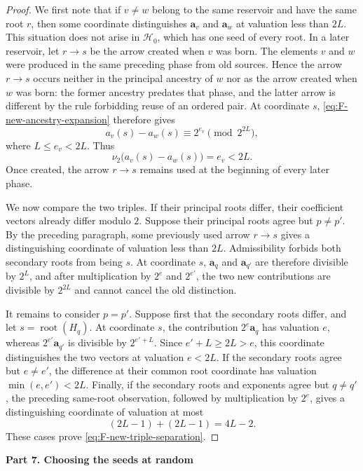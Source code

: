 \documentclass{article}
\theoremstyle{definition}
\begin{document}
\begin{proof}
We first note that if $v\neq w$ belong to the same reservoir and have the same
root $r$, then some coordinate distinguishes $\mathbf a_v$ and $\mathbf a_w$
at valuation less than $2L$.  This situation does not arise in
$\mathcal H_0$, which has one seed of every root.  In a later reservoir, let
$r\to s$ be the arrow created when $v$ was born.  The elements $v$ and $w$
were produced in the same preceding phase from old sources.  Hence the arrow
$r\to s$ occurs neither in the principal ancestry of $w$ nor as the arrow
created when $w$ was born: the former ancestry predates that phase, and the
latter arrow is different by the rule forbidding reuse of an ordered pair.
At coordinate $s$,
\eqref{eq:F-new-ancestry-expansion} therefore gives
$$
 a_v(s)-a_w(s)\equiv2^{e_v}\pmod {2^{2L}},
$$
where $L\leq e_v<2L$.  Thus
$$
 \nu_2\bigl(a_v(s)-a_w(s)\bigr)=e_v<2L.
$$
Once created, the arrow $r\to s$ remains used at the beginning of every later
phase.

We now compare the two triples.  If their principal roots differ, their
coefficient vectors already differ modulo $2$.  Suppose their principal roots
agree but $p\neq p'$.  By the preceding paragraph, some previously used arrow
$r\to s$ gives a distinguishing coordinate of valuation less than $2L$.
Admissibility forbids both secondary roots from being $s$.  At coordinate $s$,
$\mathbf a_q$ and $\mathbf a_{q'}$ are therefore divisible by $2^L$, and after
multiplication by $2^e$ and $2^{e'}$, the two new contributions are divisible
by $2^{2L}$ and cannot cancel the old distinction.

It remains to consider $p=p'$.  Suppose first that the secondary roots differ,
and let $s=\operatorname{root}(H_q)$.  At coordinate $s$, the contribution
$2^e\mathbf a_q$ has valuation $e$, whereas
$2^{e'}\mathbf a_{q'}$ is divisible by $2^{e'+L}$.  Since
$e'+L\geq2L>e$, this coordinate distinguishes the two vectors at valuation
$e<2L$.  If the secondary roots agree but $e\neq e'$, the difference at their common root coordinate has valuation $\min(e,e')<2L$.  Finally, if the secondary roots and exponents agree
but $q\neq q'$, the preceding same-root observation, followed by multiplication
by $2^e$, gives a distinguishing coordinate of valuation at most
$$
 (2L-1)+(2L-1)=4L-2.
$$
These cases prove \eqref{eq:F-new-triple-separation}.
\end{proof}

\vskip 10pt


\noindent
{\bf Part 7. Choosing the seeds at random}
 
\end{document}
